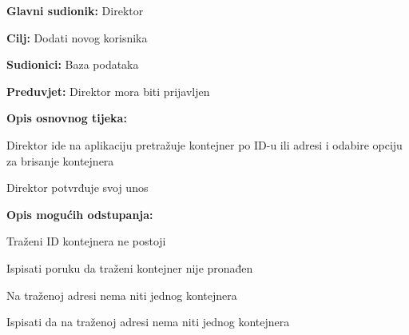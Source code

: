 			\noindent {}
			\begin{packed_item}
				
				\item \textbf{Glavni sudionik: } Direktor
				\item  \textbf{Cilj:} Dodati novog korisnika
				\item  \textbf{Sudionici:} Baza podataka
				\item  \textbf{Preduvjet:} Direktor mora biti prijavljen
				\item  \textbf{Opis osnovnog tijeka:}
				
				\item[] \begin{packed_enum}
					
					\item Direktor ide na aplikaciju pretražuje kontejner po ID-u ili adresi i odabire opciju za brisanje kontejnera
					\item Direktor potvrđuje svoj unos
				\end{packed_enum}
				
				\item  \textbf{Opis mogućih odstupanja:}
				
				\item[] \begin{packed_item}
					
					\item[2.a] Traženi ID kontejnera ne postoji
					\item[] \begin{packed_enum}
						
						\item Ispisati poruku da traženi kontejner nije pronađen
						
					\end{packed_enum}
					\item[2.b] Na traženoj adresi nema niti jednog kontejnera
							\item[] \begin{packed_enum}
						
						\item Ispisati da na traženoj adresi nema niti jednog kontejnera
						
					\end{packed_enum}
					
				\end{packed_item}
			\end{packed_item}
			
